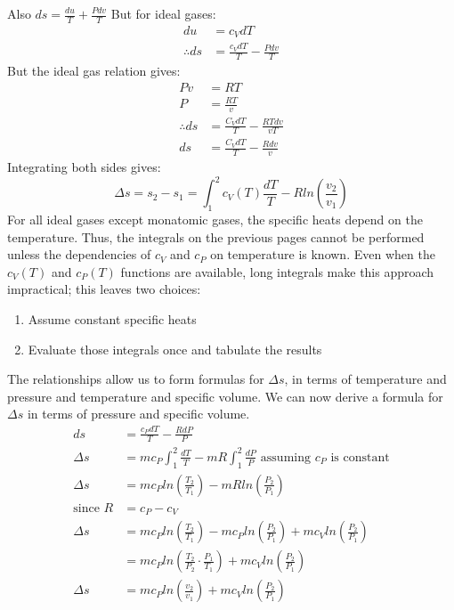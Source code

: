 \documentclass[class=report, crop=false, 12pt,a4paper]{standalone}
\numberwithin{equation}{section}
\begin{document}
Also \( ds = \frac{du}{T} + \frac{Pdv}{T} \)
But for ideal gases:
\begin{align}
  du &= c_V dT\\
  \therefore ds &= \frac{c_VdT}{T} - \frac{Pdv}{T}
\end{align}
But the ideal gas relation gives:
\begin{align}
  Pv&=RT\\
  P&=\frac{RT}{v}\\
  \therefore ds &= \frac{C_VdT}{T} - \frac{RTdv}{vT}\\
  ds &= \frac{C_VdT}{T} - \frac{Rdv}{v}
\end{align}
Integrating both sides gives:
\begin{equation} 
  \Delta s = s_2 - s_1 = \int_1^2 c_V(T)\frac{dT}{T} - Rln\left(\frac{v_2}{v_1}\right) 
\end{equation}
For all ideal gases except monatomic gases, the specific heats depend on the temperature. Thus, the integrals on the previous pages cannot be performed unless the dependencies of \(c_V\) and \(c_P\) on temperature is known. Even when the \(c_V(T)\) and \(c_P(T)\) functions are available, long integrals make this approach impractical; this leaves two choices:
\begin{enumerate}[noitemsep]
  \item Assume constant specific heats
  \item Evaluate those integrals once and tabulate the results
\end{enumerate}
The relationships allow us to form formulas for \(\Delta s\), in terms of temperature and pressure and temperature and specific volume. We can now derive a formula for \(\Delta s\) in terms of pressure and specific volume.
\begin{align}
  ds &= \frac{c_PdT}{T} - \frac{RdP}{P}\\
  \Delta s &= mc_P \int_1^2 \frac{dT}{T} - mR \int_1^2 \frac{dP}{P} \textrm{ assuming \(c_P\) is constant}\\ 
  \Delta s &= mc_P ln \left( \frac{T_2}{T_1} \right) - mRln \left( \frac{P_2}{P_1} \right)\\
  \textrm{since } R &= c_P - c_V\\
  \Delta s &= mc_P ln \left( \frac{T_2}{T_1} \right) - mc_P ln \left( \frac{P_2}{P_1} \right) + mc_V ln \left( \frac{P_2}{P_1} \right)\\
  &= mc_P ln \left(\frac{T_2}{P_2} \cdot \frac{P_1}{T_1} \right) + mc_V ln \left( \frac{P_2}{P_1} \right)\\
  \Delta s &= mc_P ln \left( \frac{v_2}{v_1} \right) + mc_Vln\left( \frac{P_2}{P_1} \right)
\end{align}
\end{document}
